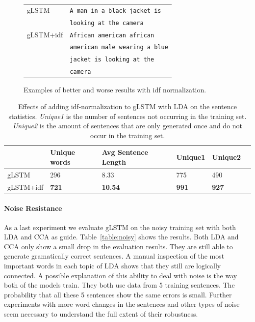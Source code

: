 \documentclass[twoside,twocolumn]{article}
\begin{document}
\begin{figure}
\begin{minipage}[t]{.45\textwidth}
		\end{minipage}\hfill
		\begin{minipage}[t]{.7\textwidth}
			\vspace{0pt}
			\begin{tabular}{ll}
				gLSTM & \texttt{A man in a black jacket is} \\ 
				~ & \texttt{looking at the camera} \\
				gLSTM+idf & \texttt{African american african}\\
				~ & \texttt{american male wearing a blue} \\
				~ & \texttt{jacket is looking at the} \\
				~ & \texttt{camera} \\
			\end{tabular}
		\end{minipage}
		\caption{Examples of better and worse results with idf normalization.}
		\label{fig:idf}
	\end{figure}
	
	\begin{table}
		\centering
		\begin{tabular}{llllll}
			~                   & Unique words& Avg Sentence Length & Unique1 & Unique2 \\ \hline
			gLSTM                         & 296   & 8.33   & 775   & 490  \\
			
			gLSTM+idf                 & \textbf{721}   & \textbf{10.54}   & \textbf{991}   & \textbf{927}    \\\hline
		\end{tabular}
		\caption{Effects of adding idf-normalization to gLSTM with LDA on the sentence statistics. \emph{Unique1} is the number of sentences not occurring in the training set. \emph{Unique2} is the amount of sentences that are only generated once and do not occur in the training set.}
		\label{table:idf-stats}
	\end{table}
	
	\paragraph{Noise Resistance}
	As a last experiment we evaluate gLSTM on the noisy training set with both LDA and CCA as guide.
	Table~\ref{table:noisy} shows the results. Both LDA and CCA only show a small drop in the evaluation results. They are still able to generate gramatically correct sentences. A manual inspection of the most important words in each topic of LDA shows that they still are logically connected. A possible explanation of this ability to deal with noise is the way both of the models train. They both use data from 5 training sentences. The probability that all these 5 sentences show the same errors is small. Further experiments with more word changes in the sentences and other types of noise seem necessary to understand the full extent of their robustness.
	
\end{document}
